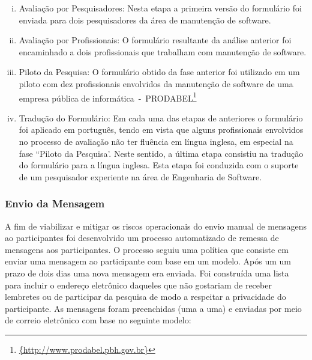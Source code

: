 \begin{enumerate}[(i)]
	\item Avaliação por Pesquisadores: Nesta etapa a primeira versão do
		formulário foi enviada para dois pesquisadores da área de manutenção de
		software.
	\item Avaliação por Profissionais: O formulário resultante da análise
		anterior foi encaminhado a dois profissionais que trabalham com
		manutenção de software.
	\item Piloto da Pesquisa: O formulário obtido da fase anterior foi utilizado
		em um piloto com dez profissionais envolvidos da manutenção de software
		de uma empresa pública de
		informática~-~PRODABEL\footnote{\url{{http://www.prodabel.pbh.gov.br}}}
	\item Tradução do Formulário: Em cada uma das etapas de anteriores o
		formulário foi aplicado em português, tendo em vista que alguns
		profissionais envolvidos no processo de avaliação não ter fluência em
		língua inglesa, em especial na fase ``Piloto da Pesquisa'. Neste
		sentido, a última etapa consistiu na tradução do formulário para a
		língua inglesa. Esta etapa foi conduzida com  o suporte de um
		pesquisador experiente na área de Engenharia de Software.
\end{enumerate}

\subsubsection{Envio da Mensagem}
\label{subsubsub:envio_mensagem}

A fim de viabilizar e mitigar os riscos operacionais do envio manual de
mensagens ao participantes foi desenvolvido um processo automatizado de remessa
de mensagens aos participantes. O processo seguiu uma política que consiste em
enviar uma mensagem ao participante com base em um modelo. Após um um prazo de
dois dias uma nova mensagem era enviada. Foi construída uma lista para incluir o
endereço eletrônico daqueles que não gostariam de receber lembretes ou de
participar da pesquisa de modo a respeitar a privacidade do participante. As
mensagens foram preenchidas (uma a uma) e enviadas por meio de correio
eletrônico com base no seguinte modelo:


